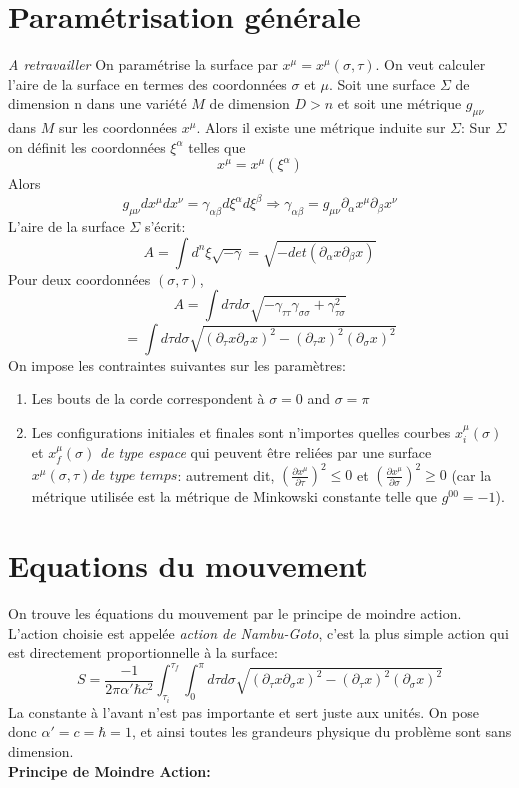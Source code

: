 \documentclass[a4paper,12pt]{article}
\def\xmu{x^\mu}
\begin{document}
\section{Paramétrisation générale}
\textit{A retravailler}
On paramétrise la surface par $x^{\mu}=x^{\mu}(\sigma,\tau)$. On veut calculer l'aire de la surface en termes des coordonnées $\sigma$ et $\mu$.
Soit une surface $\Sigma$ de dimension n dans une variété $M$ de dimension $D>n$ et soit une métrique $g_{\mu\nu}$ dans $M$ sur les coordonnées $\xmu$. Alors il existe une métrique induite sur $\Sigma$:
Sur $\Sigma$ on définit les coordonnées $\xi^\alpha$ telles que 
$$\xmu=\xmu(\xi^\alpha) $$
Alors $$g_{\mu\nu}d\xmu dx^\nu=\gamma_{\alpha\beta}d\xi^\alpha d\xi^\beta \Rightarrow \gamma_{\alpha\beta}=g_{\mu\nu}\partial_\alpha\xmu\partial_\beta x^\nu$$
L'aire de la surface $\Sigma$ s'écrit: $$A=\int d^n\xi\sqrt{-\gamma}=\sqrt{-det(\partial_\alpha x\partial_\beta x)}$$
Pour deux coordonnées $(\sigma,\tau)$, $$A=\int d\tau d\sigma \sqrt{-\gamma_{\tau\tau}\gamma_{\sigma\sigma}+\gamma^2_{\tau\sigma}}$$
$$=\int d\tau d\sigma \sqrt{(\partial_\tau x \partial_\sigma x)^2-(\partial_\tau x)^2(\partial_\sigma x)^2}$$
On impose les contraintes suivantes sur les paramètres:
\begin{enumerate}
\item Les bouts de la corde correspondent à $\sigma=0$ and $\sigma=\pi$
\item Les configurations initiales et finales sont n'importes quelles courbes $x^{\mu}_{i}(\sigma)$ et $x^{\mu}_{f}(\sigma)$  \textit{de type espace} qui peuvent être reliées par une surface $x^{\mu}(\sigma,\tau) \textit{de type temps}$:
autrement dit, $\left( \frac{\partial x^{\mu}}{\partial \tau}\right)^{2}\leq 0 $ et $\left( \frac{\partial x^{\mu}}{\partial \sigma}\right)^{2}\geq 0 $ (car la métrique utilisée est la métrique de Minkowski constante telle que $g^{00}=-1$).
\end{enumerate}
\section{Equations du mouvement}
On trouve les équations du mouvement par le principe de moindre action. L'action choisie est appelée \textit{action de Nambu-Goto}, c'est la plus simple action qui est directement proportionnelle à la surface:
\begin{equation}
S=\frac{-1}{2\pi \alpha'\hbar c^{2}}\int_{\tau_{i}}^{\tau_{f}}\int_{0}^{\pi}d\tau d\sigma \sqrt{(\partial_\tau x \partial_\sigma x)^2-(\partial_\tau x)^2(\partial_\sigma x)^2}
\end{equation} 
La constante à l'avant n'est pas importante et sert juste aux unités. On pose donc $\alpha '=c=\hbar =1$, et ainsi toutes les grandeurs physique du problème sont sans dimension.\\
\textbf{Principe de Moindre Action:} 
\end{document}
